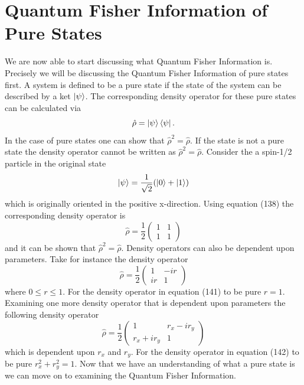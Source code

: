 \documentclass[twocolumn]{article}
\begin{document}
\section*{Quantum Fisher Information of Pure States}
We are now able to start discussing what Quantum Fisher Information is. Precisely we will be discussing the Quantum Fisher Information of pure states first. A system is defined to be a pure state if the state of the system can be described by a ket $\ket{\psi}$. The corresponding density operator for these pure states can be calculated via
\begin{equation}
\hat{\rho}=\ket{\psi}\bra{\psi}.
\end{equation}
In the case of pure states one can show that $\hat{\rho}^2=\hat{\rho}$. If the state is not a pure state the density operator cannot be written as $\hat{\rho}^2=\hat{\rho}$. Consider the a spin-1/2 particle in the original state
\begin{equation}
\ket{\psi}=\frac{1}{\sqrt{2}}(\ket{0}+\ket{1})
\end{equation}
which is originally oriented in the positive x-direction. Using equation (138) the corresponding density operator is
\begin{equation}
\hat{\rho}=\frac{1}{2}
\begin{pmatrix}
1 & 1 \\
1 & 1
\end{pmatrix}
\end{equation}
and it can be shown that $\hat{\rho}^2=\hat{\rho}$. Density operators can also be dependent upon parameters. Take for instance the density operator
\begin{equation}
\hat{\rho}=\frac{1}{2}
\begin{pmatrix}
1 & -ir \\
ir & 1
\end{pmatrix}
\end{equation}
where $0\leq r \leq 1$. For the density operator in equation (141) to be pure $r=1$. Examining one more density operator that is dependent upon parameters the following density operator 
\begin{equation}
\hat{\rho}=\frac{1}{2}
\begin{pmatrix}
1 & r_x-ir_y \\
r_x+ir_y & 1
\end{pmatrix}
\end{equation}
which is dependent upon $r_x$ and $r_y$. For the density operator in equation (142) to be pure $r_x^2+r_y^2=1$. Now that we have an understanding of what a pure state is we can move on to examining the Quantum Fisher Information.
\end{document}
